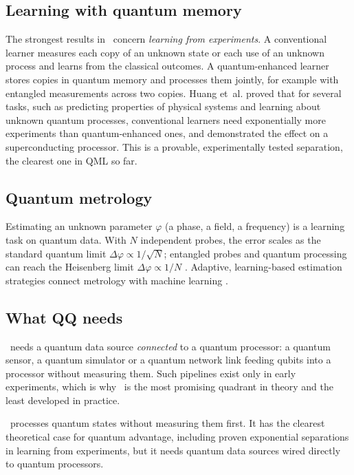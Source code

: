 \documentclass[11pt,a4paper]{article}
\begin{document}
\subsection{Learning with quantum memory}
The strongest results in \QQ\ concern \emph{learning from experiments}. A conventional learner
measures each copy of an unknown state or each use of an unknown process and learns from the
classical outcomes. A quantum-enhanced learner stores copies in quantum memory and processes them
jointly, for example with entangled measurements across two copies. Huang et~al. \citeyearpar{huang2022}
proved that for several tasks, such as predicting properties of physical systems and learning about
unknown quantum processes, conventional learners need exponentially more experiments than
quantum-enhanced ones, and demonstrated the effect on a superconducting processor. This is a provable,
experimentally tested separation, the clearest one in QML so far.

\subsection{Quantum metrology}
Estimating an unknown parameter $\varphi$ (a phase, a field, a frequency) is a learning task on
quantum data. With $N$ independent probes, the error scales as the standard quantum limit
$\Delta\varphi\propto1/\sqrt{N}$; entangled probes and quantum processing can reach the Heisenberg
limit $\Delta\varphi\propto1/N$ \citep{giovannetti2011}. Adaptive, learning-based estimation strategies
connect metrology with machine learning \citep{gebhart2023}.

\subsection{What QQ needs}
\QQ\ needs a quantum data source \emph{connected} to a quantum processor: a quantum sensor, a quantum
simulator or a quantum network link feeding qubits into a processor without measuring them. Such
pipelines exist only in early experiments, which is why \QQ\ is the most promising quadrant in theory
and the least developed in practice.

\begin{inshort}
\QQ\ processes quantum states without measuring them first. It has the clearest theoretical case for
quantum advantage, including proven exponential separations in learning from experiments, but it needs
quantum data sources wired directly to quantum processors.
\end{inshort}
\end{document}
